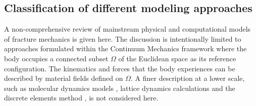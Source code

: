 \subsection{Classification of different modeling approaches} \label{sec:discretemodels}
A non-comprehensive review of mainstream physical and computational models of fracture mechanics is given here. The discussion is intentionally limited to approaches formulated within the Continuum Mechanics framework where the body occupies a connected subset $\Omega$ of the Euclidean space as its reference configuration. The kinematics and forces that the body experiences can be described by material fields defined on $\Omega$. A finer description at a lower scale, such as molecular dynamics models \cite{AbrahamBrodbeckRafeyRudge:1994}, lattice dynamics calculations \cite{MarderGross:1995} and the discrete elements method \cite{HentzDonzeDaudeville:2004}, is not considered here.

